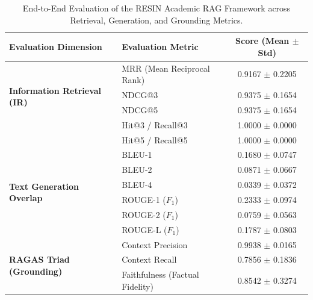\begin{table}[htbp]
\centering
\caption{End-to-End Evaluation of the RESIN Academic RAG Framework across Retrieval, Generation, and Grounding Metrics.}
\label{tab:resin_rag_benchmarks}
\begin{tabular}{l l c}
\hline
\textbf{Evaluation Dimension} & \textbf{Evaluation Metric} & \textbf{Score (Mean $\pm$ Std)} \\
\hline
\multirow{4}{*}{\textbf{Information Retrieval (IR)}}
& MRR (Mean Reciprocal Rank) & 0.9167 $\pm$ 0.2205 \\
& NDCG@3                     & 0.9375 $\pm$ 0.1654 \\
& NDCG@5                     & 0.9375 $\pm$ 0.1654 \\
& Hit@3 / Recall@3           & 1.0000 $\pm$ 0.0000 \\
& Hit@5 / Recall@5           & 1.0000 $\pm$ 0.0000 \\
\hline
\multirow{6}{*}{\textbf{Text Generation Overlap}}
& BLEU-1                     & 0.1680 $\pm$ 0.0747 \\
& BLEU-2                     & 0.0871 $\pm$ 0.0667 \\
& BLEU-4                     & 0.0339 $\pm$ 0.0372 \\
& ROUGE-1 ($F_1$)            & 0.2333 $\pm$ 0.0974 \\
& ROUGE-2 ($F_1$)            & 0.0759 $\pm$ 0.0563 \\
& ROUGE-L ($F_1$)            & 0.1787 $\pm$ 0.0803 \\
\hline
\multirow{3}{*}{\textbf{RAGAS Triad (Grounding)}}
& Context Precision          & 0.9938 $\pm$ 0.0165 \\
& Context Recall             & 0.7856 $\pm$ 0.1836 \\
& Faithfulness (Factual Fidelity) & 0.8542 $\pm$ 0.3274 \\
\hline
\end{tabular}
\end{table}